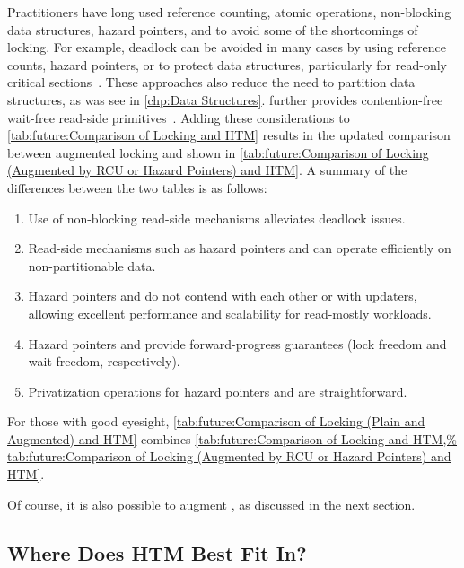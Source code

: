 Practitioners have long used reference counting, atomic operations,
non-blocking data structures, hazard pointers, and  to avoid some
of the shortcomings of locking.
For example, deadlock can be avoided in many cases by using reference
counts, hazard pointers, or  to protect data structures,
particularly for read-only critical
sections~\cite{MagedMichael04a,HerlihyLM02,MathieuDesnoyers2012URCU,DinakarGuniguntala2008IBMSysJ,ThomasEHart2007a}.
These approaches also reduce the need to partition data
structures, as was see in \cref{chp:Data Structures}.
 further provides contention-free wait-free read-side
primitives~\cite{MathieuDesnoyers2012URCU}.
Adding these considerations to
\cref{tab:future:Comparison of Locking and HTM}
results in the updated comparison between augmented locking and 
shown in
\cref{tab:future:Comparison of Locking (Augmented by RCU or Hazard Pointers) and HTM}.
A summary of the differences between the two tables is as follows:

\begin{enumerate}
\item	Use of non-blocking read-side mechanisms alleviates deadlock issues.
\item	Read-side mechanisms such as hazard pointers and  can operate
	efficiently on non-partitionable data.
\item	Hazard pointers and  do not contend with each other or with
	updaters, allowing excellent performance and scalability for
	read-mostly workloads.
\item	Hazard pointers and  provide forward-progress guarantees
	(lock freedom and wait-freedom, respectively).
\item	Privatization operations for hazard pointers and  are
	straightforward.
\end{enumerate}



For those with good eyesight,
\cref{tab:future:Comparison of Locking (Plain and Augmented) and HTM}
combines
\cref{tab:future:Comparison of Locking and HTM,%
tab:future:Comparison of Locking (Augmented by RCU or Hazard Pointers) and HTM}.

Of course, it is also possible to augment ,
as discussed in the next section.

\subsection{Where Does HTM Best Fit In?}
\label{sec:future:Where Does HTM Best Fit In?}

